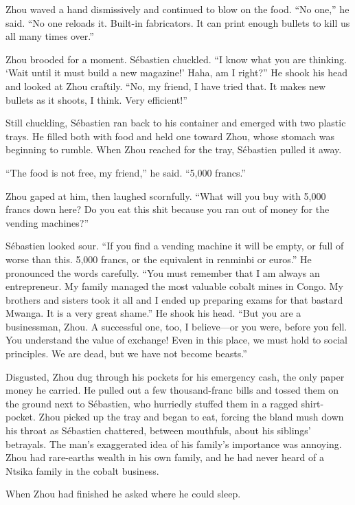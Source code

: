 \documentclass[10pt,a4paper]{article}
\begin{document}
Zhou waved a hand dismissively and continued to blow on the food.
``No one,'' he said. ``No one reloads it. Built-in fabricators.
It can print enough bullets to kill us all many times over.''

Zhou brooded for a moment. S\'{e}bastien chuckled. ``I know what you
are thinking. `Wait until it must build a new magazine!' Haha,
am I right?'' He shook his head and looked at Zhou craftily. ``No,
my friend, I have tried that. It makes new bullets as it shoots,
I think. Very efficient!''

Still chuckling, S\'{e}bastien ran back to his container and emerged
with two plastic trays. He filled both with food and held one toward
Zhou, whose stomach was beginning to rumble. When Zhou reached for
the tray, S\'{e}bastien pulled it away.

``The food is not free, my friend,'' he said. ``5,000 francs.''

Zhou gaped at him, then laughed scornfully. ``What will you buy with
5,000 francs down here? Do you eat this shit because you ran out
of money for the vending machines?''

S\'{e}bastien looked sour. ``If you find a vending machine it will be
empty, or full of worse than this. 5,000 francs, or the equivalent
in renminbi or euros.'' He pronounced the words carefully. ``You must
remember that I am always an entrepreneur. My family managed the most
valuable cobalt mines in Congo. My brothers and sisters took it all
and I ended up preparing exams for that bastard Mwanga. It is a very
great shame.'' He shook his head. ``But you are a businessman, Zhou. A
successful one, too, I believe---or you were, before you fell. You
understand the value of exchange! Even in this place, we must hold
to social principles. We are dead, but we have not become beasts.''

Disgusted, Zhou dug through his pockets for his emergency cash,
the only paper money he carried. He pulled out a few thousand-franc
bills and tossed them on the ground next to S\'{e}bastien, who hurriedly
stuffed them in a ragged shirt-pocket. Zhou picked up the tray and
began to eat, forcing the bland mush down his throat as S\'{e}bastien
chattered, between mouthfuls, about his siblings' betrayals.
The man's exaggerated idea of his family's importance was annoying.
Zhou had rare-earths wealth in his own family, and he had never
heard of a Ntsika family in the cobalt business.

When Zhou had finished he asked where he could sleep.
\end{document}
